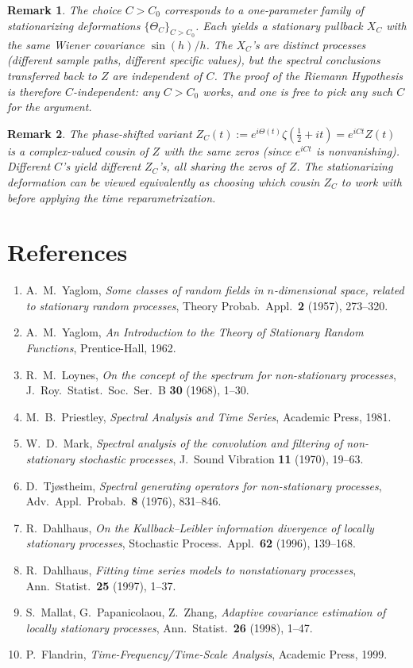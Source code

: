 \documentclass[11pt]{amsart}
\theoremstyle{plain}
\newtheorem{remark}{Remark}
\begin{document}
\begin{remark}
The choice $C > C_0$ corresponds to a one-parameter family of stationarizing deformations $\{\Theta_C\}_{C > C_0}$. Each yields a stationary pullback $X_C$ with the same Wiener covariance $\sin(h)/h$. The $X_C$'s are distinct processes (different sample paths, different specific values), but the spectral conclusions transferred back to $Z$ are independent of $C$. The proof of the Riemann Hypothesis is therefore $C$-independent: any $C > C_0$ works, and one is free to pick any such $C$ for the argument.
\end{remark}

\begin{remark}
The phase-shifted variant $Z_C(t) := e^{i\Theta(t)}\zeta(\tfrac{1}{2}+it) = e^{iCt} Z(t)$ is a complex-valued cousin of $Z$ with the same zeros (since $e^{iCt}$ is nonvanishing). Different $C$'s yield different $Z_C$'s, all sharing the zeros of $Z$. The stationarizing deformation can be viewed equivalently as choosing which cousin $Z_C$ to work with before applying the time reparametrization.
\end{remark}

\section*{References}

\begin{enumerate}
\item A.~M.~Yaglom, \emph{Some classes of random fields in $n$-dimensional space, related to stationary random processes}, Theory Probab.\ Appl.\ \textbf{2} (1957), 273--320.
\item A.~M.~Yaglom, \emph{An Introduction to the Theory of Stationary Random Functions}, Prentice-Hall, 1962.
\item R.~M.~Loynes, \emph{On the concept of the spectrum for non-stationary processes}, J.~Roy.\ Statist.\ Soc.\ Ser.\ B \textbf{30} (1968), 1--30.
\item M.~B.~Priestley, \emph{Spectral Analysis and Time Series}, Academic Press, 1981.
\item W.~D.~Mark, \emph{Spectral analysis of the convolution and filtering of non-stationary stochastic processes}, J.~Sound Vibration \textbf{11} (1970), 19--63.
\item D.~Tj{\o}stheim, \emph{Spectral generating operators for non-stationary processes}, Adv.~Appl.~Probab.\ \textbf{8} (1976), 831--846.
\item R.~Dahlhaus, \emph{On the Kullback--Leibler information divergence of locally stationary processes}, Stochastic Process.\ Appl.\ \textbf{62} (1996), 139--168.
\item R.~Dahlhaus, \emph{Fitting time series models to nonstationary processes}, Ann.\ Statist.\ \textbf{25} (1997), 1--37.
\item S.~Mallat, G.~Papanicolaou, Z.~Zhang, \emph{Adaptive covariance estimation of locally stationary processes}, Ann.\ Statist.\ \textbf{26} (1998), 1--47.
\item P.~Flandrin, \emph{Time-Frequency/Time-Scale Analysis}, Academic Press, 1999.
\end{enumerate}
\end{document}
